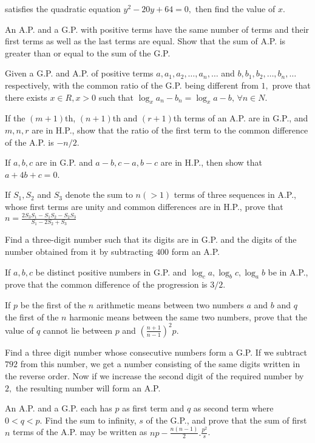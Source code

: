   satisfies the quadratic equation $y^2 - 20y + 64 = 0,$ then find the value of $x$.
\item An A.P. and a G.P. with positive terms have the same number of terms and their first terms as well as the last
  terms are equal. Show that the sum of A.P. is greater than or equal to the sum of the G.P.
\item Given a G.P. and A.P. of positive terms $a, a_1, a_2, \ldots, a_n, \ldots$ and $b, b_1, b_2, \ldots, b_n, \ldots$
  respectively, with the common ratio of the G.P. being different from $1,$ prove that there exists $x\in R, x > 0$ such that
  $\log_x a_n - b_n = \log_x a - b,\,\forall n\in N$.
\item If the $(m + 1)$th, $(n + 1)$th and $(r + 1)$th terms of an A.P. are in G.P., and $m, n, r$ are in H.P., show that
  the ratio of the first term to the common difference of the A.P. is $-n/2$.
\item If $a, b, c$ are in G.P. and $a - b, c - a, b - c$ are in H.P., then show that $a + 4b + c = 0$.
\item If $S_1, S_2$ and $S_3$ denote the sum to $n(> 1)$ terms of three sequences in A.P., whose first terms are unity
  and common differences are in H.P., prove that $n = \frac{2S_3S_1 - S_1S_2 - S_2S_3}{S_1 - 2S_2 + S_3}$
\item Find a three-digit number such that its digits are in G.P. and the digits of the number obtained from it by
  subtracting $400$ form an A.P.
\item If $a, b, c$ be distinct positive numbers in G.P. and $\log_c a, \log_b c, \log_a b$ be in A.P., prove that the
  common difference of the progression is $3/2$.
\item If $p$ be the first of the $n$ arithmetic means between two numbers $a$ and $b$ and $q$ the first of the $n$
  harmonic means between the same two numbers, prove that the value of $q$ cannot lie between $p$ and $\left(\frac{n + 1}{n -
    1}\right)^2p$.
\item Find a three digit number whose consecutive numbers form a G.P. If we subtract $792$ from this number, we get a
  number consisting of the same digits written in the reverse order. Now if we increase the second digit of the required number by
  $2,$ the resulting number will form an A.P.
\item An A.P. and a G.P. each has $p$ as first term and $q$ as second term where $0 < q < p.$ Find the sum to infinity,
  $s$ of the G.P., and prove that the sum of first $n$ terms of the A.P. may be written as $np - \frac{n(n - 1)}{2}.\frac{p^2}{s}$.
